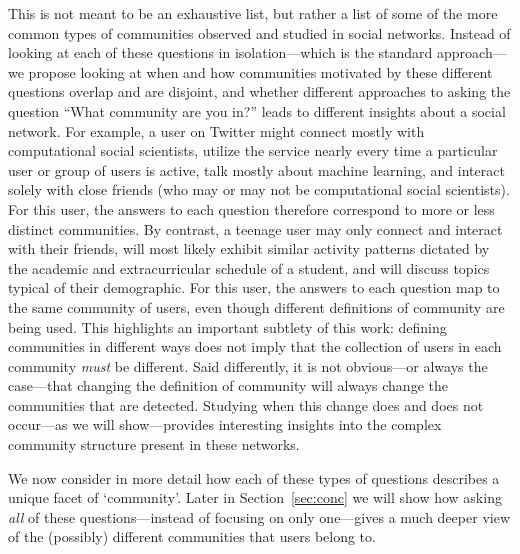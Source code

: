 This is not meant to be an exhaustive list, but rather a list of some of the more common types of communities observed and studied in social networks. Instead of looking at each of these questions in isolation---which is the standard approach---we propose looking at when and how communities motivated by these different questions overlap and are disjoint, and whether different approaches to asking the question ``What community are you in?'' leads to different insights about a social network. For example, a user on Twitter might connect mostly with computational social scientists, utilize the service nearly every time a particular user or group of users is active, talk mostly about machine learning, and interact solely with close friends (who may or may not be computational social scientists). 
For this user, the answers to each question therefore correspond to more or less distinct communities. By contrast, a teenage user may only connect and interact with their friends, will most likely exhibit similar activity patterns dictated by the academic and extracurricular schedule of a student, and will discuss topics typical of their demographic. For this user, the answers to each question map to the same community of users, even though different definitions of community are being used. This highlights an important subtlety of this work: defining communities in different ways does not imply that the collection of users in each community \emph{must} be different. Said differently, it is not obvious---or always the case---that changing the definition of community will always change the communities that are detected. Studying when this change does and does not occur---as we will show---provides interesting insights into the complex community structure present in these networks.

We now consider in more detail how each of these types of questions describes a unique facet of `community'. Later in Section~\ref{sec:conc} we will show how asking \emph{all} of these questions---instead of focusing on only one---gives a much deeper view of the (possibly) different communities that users belong to. 

